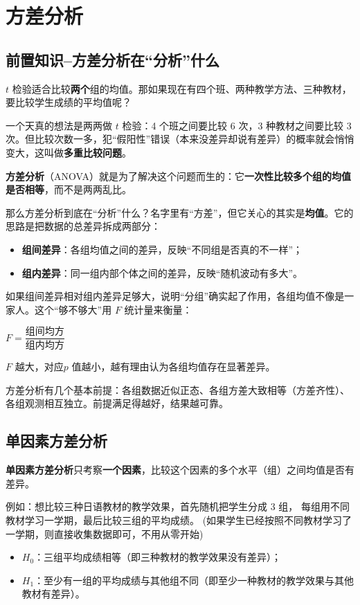 \documentclass[lang=cn,10pt]{elegantbook}
\begin{document}
\chapter{方差分析}
\section{前置知识--方差分析在“分析”什么}
$t$ 检验适合比较\textbf{两个}组的均值。那如果现在有四个班、两种教学方法、三种教材，要比较学生成绩的平均值呢？

一个天真的想法是两两做 $t$ 检验：4 个班之间要比较 6 次，3 种教材之间要比较 3 次。但比较次数一多，犯“假阳性”错误（本来没差异却说有差异）的概率就会悄悄变大，这叫做\textbf{多重比较问题}。

\textbf{方差分析}（ANOVA）就是为了解决这个问题而生的：它\textbf{一次性比较多个组的均值是否相等}，而不是两两乱比。

那么方差分析到底在“分析”什么？名字里有“方差”，但它关心的其实是\textbf{均值}。它的思路是把数据的总差异拆成两部分：
\begin{itemize}
  \item \textbf{组间差异}：各组均值之间的差异，反映“不同组是否真的不一样”；
  \item \textbf{组内差异}：同一组内部个体之间的差异，反映“随机波动有多大”。
\end{itemize}

如果组间差异相对组内差异足够大，说明“分组”确实起了作用，各组均值不像是一家人。这个“够不够大”用 $F$ 统计量来衡量：
\begin{center}
$F=\dfrac{\text{组间均方}}{\text{组内均方}}$
\end{center}
$F$ 越大，对应$p$ 值越小，越有理由认为各组均值存在显著差异。

\begin{remark}
方差分析有几个基本前提：各组数据近似正态、各组方差大致相等（方差齐性）、各组观测相互独立。前提满足得越好，结果越可靠。
\end{remark}

\section{单因素方差分析}
\textbf{单因素方差分析}只考察\textbf{一个因素}，比较这个因素的多个水平（组）之间均值是否有差异。

例如：想比较三种日语教材的教学效果，首先随机把学生分成 3 组，
每组用不同教材学习一学期，最后比较三组的平均成绩。
(如果学生已经按照不同教材学习了一学期，则直接收集数据即可，不用从零开始)
\begin{itemize}
  \item $H_0$：三组平均成绩相等（即三种教材的教学效果没有差异）；
  \item $H_1$：至少有一组的平均成绩与其他组不同（即至少一种教材的教学效果与其他教材有差异）。
\end{itemize}
\end{document}
